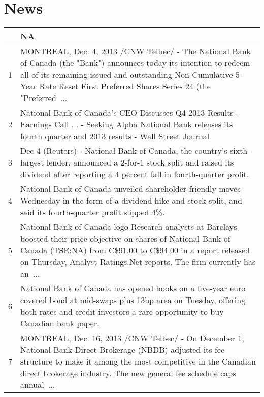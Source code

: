 \documentclass{tufte-handout}\usepackage[]{graphicx}\usepackage[]{color}
\begin{document}
% 
% 

\newpage
\section{News}


\begin{tabularx}{\textwidth}{rX}
  \hline
 & NA \\ 
  \hline
1 &  MONTREAL, Dec. 4, 2013 /CNW Telbec/ - The National Bank of Canada (the "Bank") announces today its intention to redeem all of its remaining issued and outstanding Non-Cumulative 5-Year Rate Reset First Preferred Shares Series 24 (the "Preferred ...  \\ 
  2 &  National Bank of Canada's CEO Discusses Q4 2013 Results - Earnings Call ...  -  Seeking Alpha National Bank releases its fourth quarter and 2013 results  -  Wall Street Journal \\ 
  3 &  Dec 4 (Reuters) - National Bank of Canada, the country's sixth-largest lender, announced a 2-for-1 stock split and raised its dividend after reporting a 4 percent fall in fourth-quarter profit.  \\ 
  4 &  National Bank of Canada unveiled shareholder-friendly moves Wednesday in the form of a dividend hike and stock split, and said its fourth-quarter profit slipped 4\%.  \\ 
  5 &  National Bank of Canada logo Research analysts at Barclays boosted their price objective on shares of National Bank of Canada (TSE:NA) from C\$91.00 to C\$94.00 in a report released on Thursday, Analyst Ratings.Net reports. The firm currently has an ...  \\ 
  6 &  National Bank of Canada has opened books on a five-year euro covered bond at mid-swaps plus 13bp area on Tuesday, offering both rates and credit investors a rare opportunity to buy Canadian bank paper.  \\ 
  7 &  MONTREAL, Dec. 16, 2013 /CNW Telbec/ - On December 1, National Bank Direct Brokerage (NBDB) adjusted its fee structure to make it among the most competitive in the Canadian direct brokerage industry. The new general fee schedule caps annual ...  \\ 

\end{tabularx}
\end{document}
